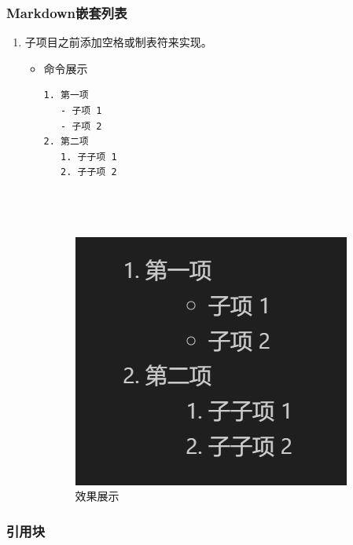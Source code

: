 \documentclass[UTF8]{ctexart}
\begin{document}
\subsubsection{Markdown嵌套列表}

\begin{enumerate}
  \item 子项目之前添加空格或制表符来实现。
  \begin{itemize}
  \item 命令展示
  \begin{verbatim}
1. 第一项
   - 子项 1
   - 子项 2
2. 第二项
   1. 子子项 1
   2. 子子项 2




  \end{verbatim}
\begin{figure}[H]
    \centering
    \includegraphics[width=\textwidth]{42} %
    \caption{效果展示}
  \end{figure}
  \end{itemize}
\end{enumerate}

\subsubsection{引用块}
\end{document}

